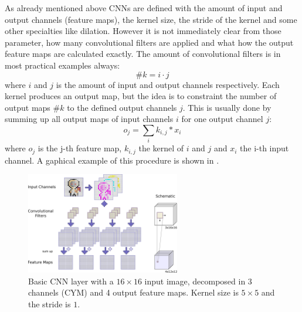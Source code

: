 As already mentioned above CNNs are defined with the amount of input and output channels (feature maps), the kernel size, the stride of the kernel and some other specialties like dilation.
However it is not immediately clear from those parameter, how many convolutional filters are applied and what how the output feature maps are calculated exactly.
The amount of convolutional filters is in most practical examples always:
\begin{equation}\label{eq:nn_theory_n_filters}
  \#k = i \cdot j
\end{equation}
where $i$ and $j$ is the amount of input and output channels respectively.
Each kernel produces an output map, but the idea is to constraint the number of output maps $\#k$ to the defined output channels $j$.
This is usually done by summing up all output maps of input channels $i$ for one output channel $j$:
\begin{equation}
  o_j = \sum_{i} k_{i, j} * x_i
\end{equation}
where $o_j$ is the j-th feature map, $k_{i, j}$ the kernel of $i$ and $j$ and $x_i$ the i-th input channel.
A gaphical example of this procedure is shown in .

\begin{figure}[!ht]
  \centering
    \includegraphics[width=0.6\textwidth]{./4_nn/figs/nn_theory_cnn_basics.eps}
  \caption{Basic CNN layer with a $16 \times 16$ input image, decomposed in 3 channels (CYM) and 4 output feature maps. Kernel size is $5 \times 5$ and the stride is $1$.}
  \label{fig:nn_theory_cnn_basics}
\end{figure}
\FloatBarrier
\noindent



